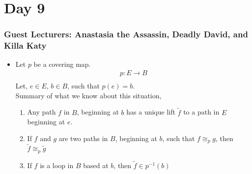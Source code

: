\section{Day 9}
    \subsubsection{Guest Lecturers: Anastasia the Assassin, Deadly David, and Killa Katy}
    \begin{itemize}
        \item Let $p$ be a covering map.
            \begin{align*}
                p: E\rightarrow B\\
            \end{align*}
            Let, $e\in E$, $b\in B$, such that $p(e)=b$.\\
            Summary of what we know about this situation,
            \begin{enumerate}
                \item Any path $f$ in $B$, beginning at $b$ has a unique lift $\tilde{f}$ to a path in $E$ beginning at $e$.
                \item If $f$ and $g$ are two paths in $B$, beginning at $b$, such that $f\cong_{p}g$, then
                    $\tilde{f}\cong_{p}\tilde{g}$
                \item If $f$ is a loop in $B$ based at $b$, then $\tilde{f}\in p^{-1}(b)$
            \end{enumerate}
    \end{itemize}
